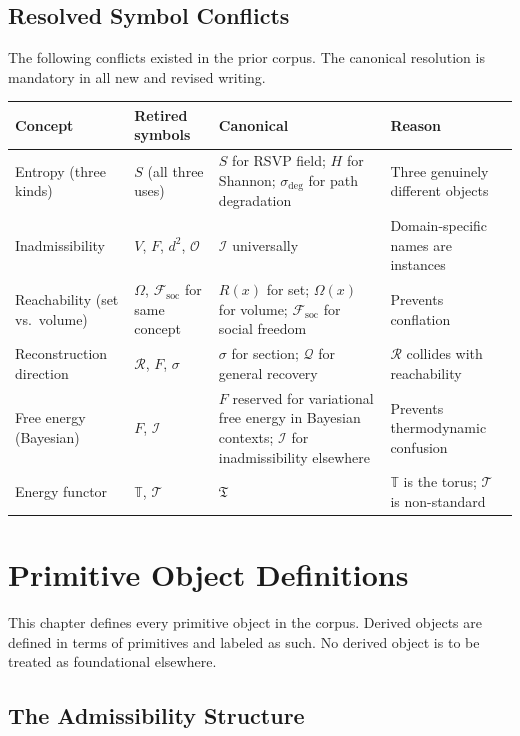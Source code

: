 \documentclass[11pt, a4paper]{book}
\theoremstyle{flyxion}
\theoremstyle{remark}
\begin{document}
\section{Resolved Symbol Conflicts}

The following conflicts existed in the prior corpus. The canonical
resolution is mandatory in all new and revised writing.

\medskip
\begin{longtable}{p{3cm}p{4cm}p{4cm}p{3cm}}
\toprule
\textbf{Concept} & \textbf{Retired symbols} & \textbf{Canonical} &
\textbf{Reason} \\
\midrule
Entropy (three kinds) & $S$ (all three uses) & $S$ for RSVP field;
  $H$ for Shannon; $\sigma_\mathrm{deg}$ for path degradation &
  Three genuinely different objects \\
Inadmissibility & $V$, $F$, $d^2$, $\mathcal{O}$ & $\mathcal{I}$
  universally & Domain-specific names are instances \\
Reachability (set vs.\ volume) & $\Omega$, $\mathcal{F}_\mathrm{soc}$
  for same concept & $R(x)$ for set; $\Omega(x)$ for volume;
  $\mathcal{F}_\mathrm{soc}$ for social freedom & Prevents
  conflation \\
Reconstruction direction & $\mathcal{R}$, $F$, $\sigma$ & $\sigma$
  for section; $\mathcal{Q}$ for general recovery & $\mathcal{R}$
  collides with reachability \\
Free energy (Bayesian) & $F$, $\mathcal{I}$ & $F$ reserved for
  variational free energy in Bayesian contexts; $\mathcal{I}$ for
  inadmissibility elsewhere & Prevents thermodynamic confusion \\
Energy functor & $\mathbb{T}$, $\mathscr{T}$ & $\mathfrak{T}$ &
  $\mathbb{T}$ is the torus; $\mathscr{T}$ is non-standard \\
\bottomrule
\end{longtable}

\chapter{Primitive Object Definitions}

This chapter defines every primitive object in the corpus. Derived
objects are defined in terms of primitives and labeled as such.
No derived object is to be treated as foundational elsewhere.

\section{The Admissibility Structure}
\end{document}
